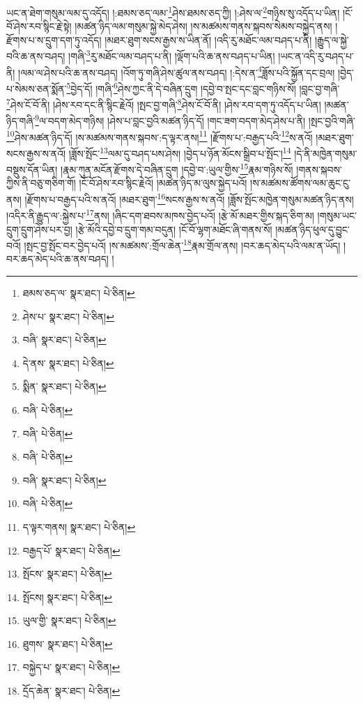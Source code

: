 ཡང་ན་ཐེག་གསུམ་ལམ་དུ་འདོད། །:ཐམས་ཅད་ལམ་\footnote{ཐམས་ཅད་ལ་  སྣར་ཐང་།  པེ་ཅིན། }ཤེས་ཐམས་ཅད་ཀྱི། །:ཤེས་ལ་\footnote{ཤེས་པ་  སྣར་ཐང་།  པེ་ཅིན། }གཉིས་སུ་འདོད་པ་ཡིན། །ངོ་བོ་ཤེས་རབ་སྙིང་རྗེ་སྟེ། །མཚན་ཉིད་ལམ་གསུམ་སྐྱེ་མེད་ཤེས། །ས་མཚམས་གནས་སྐབས་སེམས་བསྐྱེད་ནས། །རྫོགས་པ་ས་དྲུག་དག་ཏུ་འདོད། །མཐར་ཐུག་སངས་རྒྱས་ས་ཡིན་ནོ། །འདི་རུ་མཐོང་ལམ་བཤད་པ་ནི། །རྒྱུད་ལ་སྐྱེ་བའི་ཆ་ནས་བཤད། །གཞི་\footnote{བཞི་  སྣར་ཐང་།  པེ་ཅིན། }རུ་མཐོང་ལམ་བཤད་པ་ནི། །ལྡོག་པའི་ཆ་ནས་བཤད་པ་ཡིན། །ཡང་ན་འདི་རུ་བཤད་པ་ནི། །ལམ་ལ་ཤེས་པའི་ཆ་ནས་བཤད། །འོག་ཏུ་གཞི་ཤེས་ཚུལ་ནས་བཤད། །:དེས་ན་\footnote{དེ་ནས་  སྣར་ཐང་།  པེ་ཅིན། }ཟློས་པའི་སྐྱོན་དང་བྲལ། །བྱེད་པ་སེམས་ཅན་སྨོན་\footnote{སྨིན་  སྣར་ཐང་།  པེ་ཅིན། }བྱེད་དོ། །གཞི་\footnote{བཞི་  པེ་ཅིན། }ཤེས་ཀྱང་ནི་དེ་བཞིན་དྲུག །དབྱེ་བ་སྤང་དང་བླང་གཉིས་སོ། །བླང་བྱ་གཞི་\footnote{བཞི་  པེ་ཅིན། }ཤེས་ངོ་བོ་ནི། །ཤེས་རབ་དང་ནི་སྙིང་རྗེའོ། །སྤང་བྱ་གཞི་\footnote{བཞི་  པེ་ཅིན། }ཤེས་ངོ་བོ་ནི། །ཤེས་རབ་དག་ཏུ་འདོད་པ་ཡིན། །མཚན་ཉིད་གཞི་\footnote{བཞི་  སྣར་ཐང་།  པེ་ཅིན། }ལ་བདག་མེད་གཉིས། །ཤེས་པ་བླང་བྱའི་མཚན་ཉིད་དོ། །གང་ཟག་བདག་མེད་ཤེས་པ་ནི། །སྤང་བྱའི་གཞི་\footnote{བཞི་  པེ་ཅིན། }ཤེས་མཚན་ཉིད་དོ། །ས་མཚམས་གནས་སྐབས་:ད་ལྟར་ནས།\footnote{ད་ལྟར་གནས།  སྣར་ཐང་།  པེ་ཅིན། } །རྫོགས་པ་:བརྒྱད་པའི་\footnote{བརྒྱད་པོ་  སྣར་ཐང་།  པེ་ཅིན། }ས་ནའོ། །མཐར་ཐུག་སངས་རྒྱས་ས་ནའོ། །ཟློས་སྤོང་\footnote{སྤོངས་  སྣར་ཐང་།  པེ་ཅིན། }ལམ་དུ་བཤད་པས་ཤེས། །བྱེད་པ་ཉོན་མོངས་སྒྲིབ་པ་སྤོང་།\footnote{སྤོངས།  སྣར་ཐང་།  པེ་ཅིན། } །དེ་ནི་མཁྱེན་གསུམ་བསྡུས་དོན་ཡིན། །རྣམ་ཀུན་མངོན་རྫོགས་དེ་བཞིན་དྲུག །དབྱེ་བ་:ཡུལ་གྱིས་\footnote{ཡུལ་གྱི་  སྣར་ཐང་།  པེ་ཅིན། }རྣམ་གཉིས་སོ། །གནས་སྐབས་ཀྱིས་ནི་བཅུ་གཅིག་གོ། །ངོ་བོ་ཤེས་རབ་སྙིང་རྗེའོ། །མཚན་ཉིད་མ་ལུས་སྐྱེད་པའོ། །ས་མཚམས་ཚོགས་ལམ་ཆུང་ངུ་ནས། །རྫོགས་པ་བརྒྱད་པའི་ས་ནའོ། །མཐར་ཐུག་\footnote{ཐུགས་  སྣར་ཐང་།  པེ་ཅིན། }སངས་རྒྱས་ས་ནའོ། །ཟློས་སྤོང་མཁྱེན་གསུམ་མཚན་ཉིད་ནས། །འདིར་ནི་རྒྱུད་ལ་:སྐྱེས་པ་\footnote{བསྐྱེད་པ་  སྣར་ཐང་།  པེ་ཅིན། }ནས། །ཞིང་དག་ཐབས་མཁས་བྱེད་པའོ། །རྩེ་མོ་མཐར་གྱིས་སྐད་ཅིག་མ། །གསུམ་ཡང་དྲུག་དྲུག་ཤེས་པར་བྱ། །རྩེ་མོའི་དབྱེ་བ་དྲུག་གམ་བདུན། །ངོ་བོ་ལྷག་མཐོང་ཞི་གནས་སོ། །མཚན་ཉིད་ཕུལ་དུ་བྱུང་བའོ། །སྤང་བྱ་སྤོང་བར་བྱེད་པའོ། །ས་མཚམས་:གྲོལ་ཆེན་\footnote{དྲོད་ཆེན་  སྣར་ཐང་།  པེ་ཅིན། }རྣམ་གྲོལ་ནས། །བར་ཆད་མེད་པའི་ལམ་ན་ཡོད། །བར་ཆད་མེད་པའི་ཆ་ནས་བཤད། །
